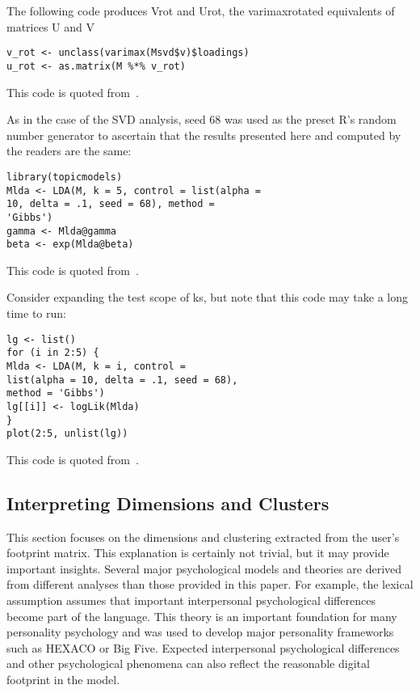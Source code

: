 The following code produces Vrot and Urot, the varimaxrotated
equivalents of matrices U and V

\begin{verbatim}
v_rot <- unclass(varimax(Msvd$v)$loadings)
u_rot <- as.matrix(M %*% v_rot)
\end{verbatim}

This code is quoted from~\cite{editor12}.

As in the case of the SVD analysis, seed 68 was used as the preset
 R’s random number generator to ascertain that the results 
presented here and computed by the readers are the same:

\begin{verbatim}
library(topicmodels)
Mlda <- LDA(M, k = 5, control = list(alpha =
10, delta = .1, seed = 68), method =
'Gibbs')
gamma <- Mlda@gamma
beta <- exp(Mlda@beta)
\end{verbatim}

This code is quoted from~\cite{editor12}.

Consider expanding the test scope of ks, but note that this code 
may take a long time to run:

\begin{verbatim}
lg <- list()
for (i in 2:5) {
Mlda <- LDA(M, k = i, control =
list(alpha = 10, delta = .1, seed = 68),
method = 'Gibbs')
lg[[i]] <- logLik(Mlda)
}
plot(2:5, unlist(lg))
\end{verbatim}

This code is quoted from~\cite{editor12}.

\subsection{Interpreting Dimensions and Clusters}

This section focuses on the dimensions and clustering extracted 
from the user's footprint matrix. This explanation is certainly not
 trivial, but it may provide important insights. Several major 
psychological models and theories are derived from different 
analyses than those provided in this paper. For example, the 
lexical assumption assumes that important interpersonal 
psychological differences become part of the language. This theory
 is an important foundation for many personality psychology and was
 used to develop major personality frameworks such as HEXACO or Big
 Five. Expected interpersonal psychological differences and other 
psychological phenomena can also reflect the reasonable digital 
footprint in the model.

